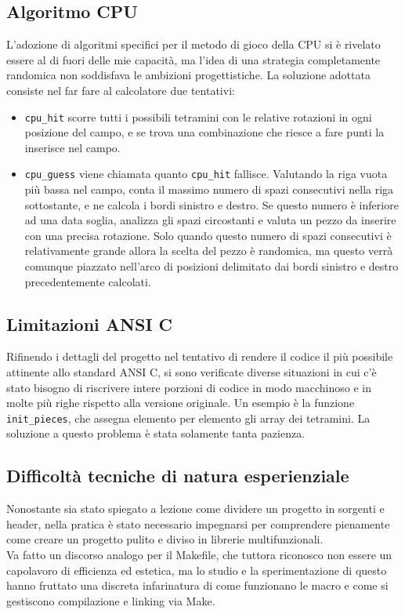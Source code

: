\documentclass[a4paper]{article}
\begin{document}
\subsection{Algoritmo CPU}
L'adozione di algoritmi specifici per il metodo di gioco della CPU si è rivelato essere al di fuori delle mie capacità, ma l'idea di una strategia completamente randomica non soddisfava le ambizioni progettistiche. La soluzione adottata consiste nel far fare al calcolatore due tentativi:
\begin{itemize}
	\item \texttt{cpu_hit} scorre tutti i possibili tetramini con le relative rotazioni in ogni posizione del campo, e se trova una combinazione che riesce a fare punti la inserisce nel campo.
	\item \texttt{cpu_guess} viene chiamata quanto \texttt{cpu_hit} fallisce. Valutando la riga vuota più bassa nel campo, conta il massimo numero di spazi consecutivi nella riga sottostante, e ne calcola i bordi sinistro e destro. Se questo numero è inferiore ad una data soglia, analizza gli spazi circostanti e valuta un pezzo da inserire con una precisa rotazione. Solo quando questo numero di spazi consecutivi è relativamente grande allora la scelta del pezzo è randomica, ma questo verrà comunque piazzato nell'arco di posizioni delimitato dai bordi sinistro e destro precedentemente calcolati.
\end{itemize}

\newpage

\subsection{Limitazioni ANSI C}
Rifinendo i dettagli del progetto nel tentativo di rendere il codice il più possibile attinente allo standard ANSI C, si sono verificate diverse situazioni in cui c'è stato bisogno di riscrivere intere porzioni di codice in modo macchinoso e in molte più righe rispetto alla versione originale. Un esempio è la funzione \texttt{init_pieces}, che assegna elemento per elemento gli array dei tetramini. La soluzione a questo problema è stata solamente tanta pazienza.

\subsection{Difficoltà tecniche di natura esperienziale}
Nonostante sia stato spiegato a lezione come dividere un progetto in sorgenti e header, nella pratica è stato necessario impegnarsi per comprendere pienamente come creare un progetto pulito e diviso in librerie multifunzionali.\\
Va fatto un discorso analogo per il Makefile, che tuttora riconosco non essere un capolavoro di efficienza ed estetica, ma lo studio e la sperimentazione di questo hanno fruttato una discreta infarinatura di come funzionano le macro e come si gestiscono compilazione e linking via Make.
\end{document}
